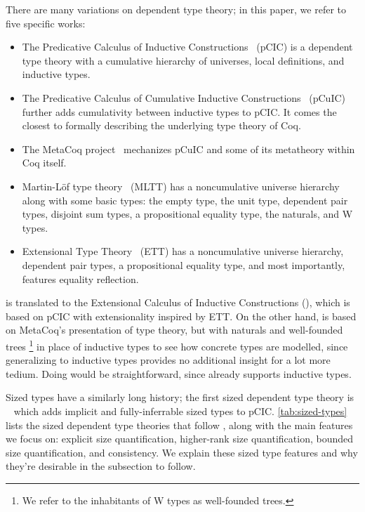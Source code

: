 \documentclass[acmsmall,review,anonymous]{acmart}\settopmatter{printfolios=true,printccs=false,printacmref=false}
\begin{document}
There are many variations on dependent type theory;
in this paper, we refer to five specific works:

\begin{itemize}
  \item The Predicative Calculus of Inductive Constructions~\citep{pCIC} (pCIC)
    is a dependent type theory with a cumulative hierarchy of universes,
    local definitions, and inductive types.
  \item The Predicative Calculus of Cumulative Inductive Constructions~\citep{pCuIC} (pCuIC)
    further adds cumulativity between inductive types to pCIC.
    It comes the closest to formally describing the underlying type theory of Coq.
  \item The MetaCoq project~\citep{MetaCoq} mechanizes pCuIC
    and some of its metatheory within Coq itself.
  \item Martin-L\"of type theory~\citep{MLTT} (MLTT) has a noncumulative universe hierarchy
    along with some basic types:
    the empty type, the unit type, dependent pair types, disjoint sum types,
    a propositional equality type, the naturals, and W types.
  \item Extensional Type Theory~\citep{CICE} (ETT) has a noncumulative universe hierarchy,
    dependent pair types, a propositional equality type,
    and most importantly, features equality reflection.
\end{itemize}

\lang is translated to the Extensional Calculus of Inductive Constructions (\CICE),
which is based on pCIC with extensionality inspired by ETT.
On the other hand, \lang is based on MetaCoq's presentation of type theory,
but with naturals and well-founded trees%
\footnote{We refer to the inhabitants of W types as well-founded trees.}
in place of inductive types to see how concrete types are modelled,
since generalizing to inductive types provides no additional insight for a lot more tedium.
Doing would be straightforward, since \CICE already supports inductive types.

Sized types have a similarly long history;
the first sized dependent type theory is \CIChat~\citep{CIC-hat}
which adds implicit and fully-inferrable sized types to pCIC.
\cref{tab:sized-types} lists the sized dependent type theories that follow \CIChat,
along with the main features we focus on:
explicit size quantification,
higher-rank size quantification,
bounded size quantification,
and consistency.
We explain these sized type features and why they're desirable
in the subsection to follow.
\end{document}
